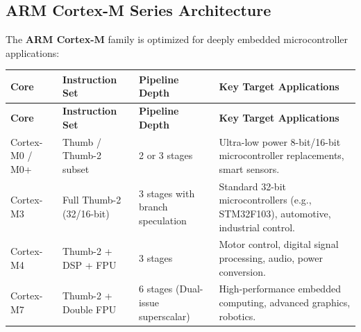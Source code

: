\documentclass[12pt,a4paper]{article}
\begin{document}
\begin{tcolorbox}[tikzbox, title={ARM Core Datapath: Inline Barrel Shifter and ALU}]
\centering
{}
\end{tcolorbox}

\subsection{ARM Cortex-M Series Architecture}
The \textbf{ARM Cortex-M} family is optimized for deeply embedded microcontroller applications:
\par\vspace{6pt}\noindent
\begingroup
\setlength{\extrarowheight}{2.5pt}
\begingroup
\setlength{\LTleft}{0pt}
\setlength{\LTright}{0pt}
\begin{longtable}{|B{2.6cm}|B{2.2cm}|B{3.2cm}|>{\small\raggedright\arraybackslash}m{\dimexpr(\linewidth-2.6cm-2.2cm-3.2cm-8\arrayrulewidth)/1\relax}|}
\hline
\textbf{Core} & \textbf{Instruction Set} & \textbf{Pipeline Depth} & \textbf{Key Target Applications} \\ \hline
\endfirsthead
\hline
\textbf{Core} & \textbf{Instruction Set} & \textbf{Pipeline Depth} & \textbf{Key Target Applications} \\ \hline
\endhead
Cortex-M0 / M0+ & Thumb / Thumb-2 subset & 2 or 3 stages & Ultra-low power 8-bit/16-bit microcontroller replacements, smart sensors. \\ \hline
Cortex-M3 & Full Thumb-2 (32/16-bit) & 3 stages with branch speculation & Standard 32-bit microcontrollers (e.g., STM32F103), automotive, industrial control. \\ \hline
Cortex-M4 & Thumb-2 + DSP + FPU & 3 stages & Motor control, digital signal processing, audio, power conversion. \\ \hline
Cortex-M7 & Thumb-2 + Double FPU & 6 stages (Dual-issue superscalar) & High-performance embedded computing, advanced graphics, robotics. \\ \hline
\end{longtable}
\endgroup\par
\endgroup
\end{document}

